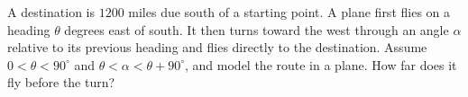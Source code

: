 A destination is $1200$ miles due south of a starting point. A plane first flies on a heading $\theta$ degrees east of south. It then turns toward the west through an angle $\alpha$ relative to its previous heading and flies directly to the destination. Assume $0<\theta<90^\circ$ and $\theta<\alpha<\theta+90^\circ$, and model the route in a plane. How far does it fly before the turn?
